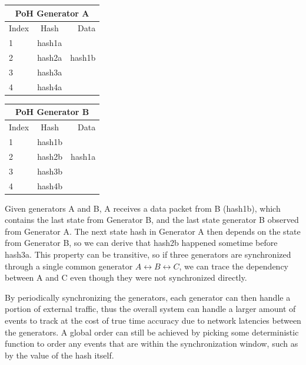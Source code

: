 \documentclass[12pt]{article}
\begin{document}
\begin{center}
  \begin{tabular}{ | l | c | r |}
    \hline
    \multicolumn{3}{|c|}{PoH Generator A} \\
    \hline
    Index & Hash & Data \\ \hline
    1 & hash1a & \\ \hline
    2 & hash2a & hash1b \\ \hline
    3 & hash3a & \\ \hline
    4 & hash4a & \\
    \hline
    \end{tabular}
  \begin{tabular}{ | l | c | r |}
    \hline
    \multicolumn{3}{|c|}{PoH Generator B} \\
    \hline
    Index & Hash & Data \\ \hline
    1 & hash1b & \\ \hline
    2 & hash2b & hash1a \\ \hline
    3 & hash3b & \\ \hline
    4 & hash4b & \\
    \hline
    \end{tabular}
\end{center}

Given generators A and B, A receives a data packet from B (hash1b), which contains the last state from Generator B, and the last state generator B observed from Generator A. The next state hash in Generator A then depends on the state from Generator B, so we can derive that hash2b happened sometime before hash3a. This property can be transitive, so if three generators are synchronized through a single common generator \(A \leftrightarrow B \leftrightarrow C\), we can trace the dependency between A and C even though they were not synchronized directly.

By periodically synchronizing the generators, each generator can then handle a portion of external traffic, thus the overall system can handle a larger amount of events to track at the cost of true time accuracy due to network latencies between the generators.  A global order can still be achieved by picking some deterministic function to order any events that are within the synchronization window, such as by the value of the hash itself.
\end{document}
